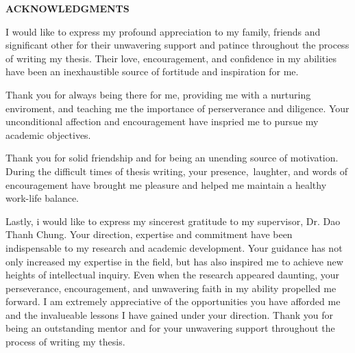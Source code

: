 \documentclass[../Main.tex]{subfiles}
\begin{document}
\begin{center}
    \Large{\textbf{ACKNOWLEDGMENTS}}\\
\end{center}
\vspace{1cm}

I would like to express my profound appreciation to my family, friends and significant other for their unwavering support and patince throughout the process of writing my thesis. Their love, encouragement, and confidence in my abilities have been an inexhaustible source of fortitude and inspiration for me.\

Thank you for always being there for me, providing me with a nurturing enviroment, and teaching me the importance of perserverance and diligence. Your unconditional affection and encouragement have inspried me to pursue my academic objectives. \

Thank you for solid friendship and for being an unending source of motivation. During the difficult times of thesis writing, your presence, laughter, and words of encouragement have brought me pleasure and helped me maintain a healthy work-life balance.\

Lastly, i would like to express my sincerest gratitude to my supervisor, Dr. Dao Thanh Chung. Your direction, expertise and commitment have been indispensable to my research and academic development. Your guidance has not only increased my expertise in the field, but has also inspired me to achieve new heights of intellectual inquiry. Even when the research appeared daunting, your perseverance, encouragement, and unwavering faith in my ability propelled me forward. I am extremely appreciative of the opportunities you have afforded me and the invalueable lessons I have gained under your direction. Thank you for being an outstanding mentor and for your unwavering support throughout the process of writing my thesis.
\end{document}
